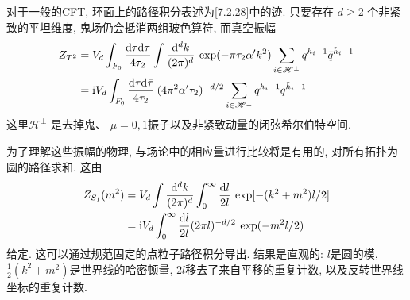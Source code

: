 对于一般的CFT, 环面上的路径积分表述为\eqref{7.2.28}中的迹. 只要存在 $d \geq 2$ 个非紧致的平坦维度, 鬼场仍会抵消两组玻色算符, 而真空振幅
\begin{subequations} \label{7.3.8}
\begin{align}
Z_{T^{2}} &=V_{d} \int_{F_{0}} \frac{\mathrm{d} \tau \mathrm{d} \bar{\tau}}{4 \tau_{2}} \int \frac{\mathrm{d}^{d} k}{(2 \pi)^{d}}\: 
\exp (-\pi \tau_{2} \alpha^{\prime} k^{2}) \sum_{i \in \mathscr{H}^{\perp}} q^{h_{i}-1} \bar{q}^{\tilde{h}_{i}-1} \label{7.3.8a}  \\
&= \mathrm{i} V_{d} \int_{F_{0}} \frac{\mathrm{d} \tau \mathrm{d} \bar{\tau}}{4 \tau_{2}} \: (4 \pi^{2} \alpha^{\prime} \tau_{2})^{-d / 2} 
\sum_{i \in \mathscr{H}^{\perp}} q^{h_{i}-1} \bar{q}^{\tilde{h}_{i}-1}  \label{7.3.8b}
\end{align}		
\end{subequations}
这里$\mathscr{H}^{\perp}$ 是去掉鬼、 $\mu=0,1$振子以及非紧致动量的闭弦希尔伯特空间. 

为了理解这些振幅的物理, 与场论中的相应量进行比较将是有用的, 对所有拓扑为圆的路径求和. 这由
\begin{align}
	Z_{S_{1}}(m^{2}) &=V_{d} \int \frac{\mathrm{d}^{d} k}{(2 \pi)^{d}} \int_{0}^{\infty} \frac{\mathrm{d} l}{2 l}  \: 
	\exp [-(k^{2}+m^{2}) l / 2] \nonumber \\
	&=\mathrm{i} V_{d} \int_{0}^{\infty} \frac{\mathrm{d} l}{2 l}(2 \pi l)^{-d / 2} \: \exp (-m^{2} l / 2)   \label{7.3.9}
\end{align}
给定. 这可以通过规范固定的点粒子路径积分导出. 结果是直观的: $l$是圆的模,  $\frac{1}{2}(k^{2}+m^{2})$是世界线的哈密顿量, 
$2 l$移去了来自平移的重复计数, 以及反转世界线坐标的重复计数.

